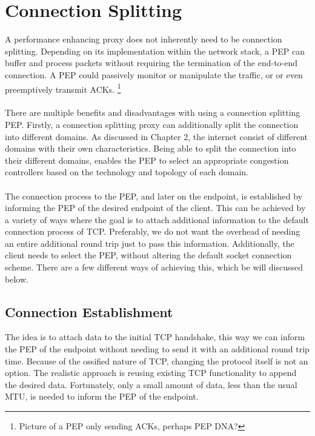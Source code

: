 \documentclass[a4paper,english, 11pt]{report}
\begin{document}
\section{Connection Splitting}
A performance enhancing proxy does not inherently need to be connection splitting. Depending on its implementation within the network stack, a PEP can buffer and process packets without requiring the termination of the end-to-end connection. A PEP could passively monitor or manipulate the traffic, or or even preemptively transmit ACKs.
\footnote{Picture of a PEP only sending ACKs, perhaps PEP DNA?}\\
\\
There are multiple benefits and disadvantages with using a connection splitting PEP. Firstly, a connection splitting proxy can additionally split the connection into different domains. As discussed in Chapter 2, the internet consist of different domains with their own characteristics. Being able to split the connection into their different domains, enables the PEP to select an appropriate congestion controllers based on the technology and topology of each domain.\\
\\
The connection process to the PEP, and later on the endpoint, is established by informing the PEP of the desired endpoint of the client. This can be achieved by a variety of ways where the goal is to attach additional information to the default connection process of TCP. Preferably, we do not want the overhead of needing an entire additional round trip just to pass this information. Additionally, the client needs to select the PEP, without altering the default socket connection scheme. There are a few different ways of achieving this, which be will discussed below.


\subsection{Connection Establishment}  
The idea is to attach data to the initial TCP handshake, this way we can inform the PEP of the endpoint without needing to send it with an additional round trip time. Because of the ossified nature of TCP, changing the protocol itself is not an option. The realistic approach is reusing existing TCP functionality to append the desired data. Fortunately, only a small amount of data, less than the usual MTU, is needed to inform the PEP of the endpoint.
\end{document}
